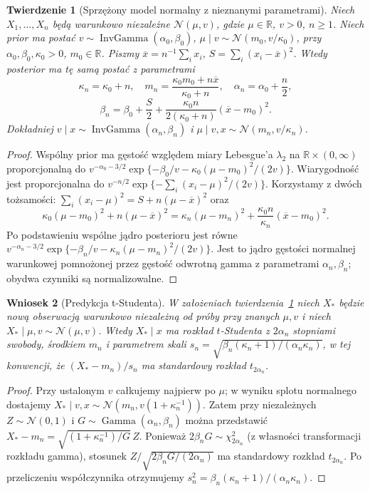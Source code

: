\documentclass[11pt,a4paper,oneside]{report}
\numberwithin{equation}{chapter}
\theoremstyle{plain}
\newtheorem{twierdzenie}{Twierdzenie}[chapter]
\newtheorem{wniosek}[twierdzenie]{Wniosek}
\theoremstyle{definition}
\theoremstyle{remark}
\newcommand{\R}{\mathbb R}
\begin{document}
\begin{twierdzenie}[Sprzężony model normalny z nieznanymi parametrami]
\label{thm:normal-invgamma}
Niech $X_1,\ldots,X_n$ będą warunkowo niezależne
$\mathcal N(\mu,v)$, gdzie $\mu\in\R$, $v>0$, $n\ge1$.
Niech prior ma postać
$v\sim\operatorname{InvGamma}(\alpha_0,\beta_0)$,
$\mu\mid v\sim\mathcal N(m_0,v/\kappa_0)$,
przy $\alpha_0,\beta_0,\kappa_0>0$, $m_0\in\R$.
Piszmy $\overline x=n^{-1}\sum_ix_i$,
$S=\sum_i(x_i-\overline x)^2$. Wtedy posterior ma tę samą
postać z parametrami
\[
 \kappa_n=\kappa_0+n,\quad
 m_n=\frac{\kappa_0m_0+n\overline x}{\kappa_0+n},\quad
 \alpha_n=\alpha_0+\frac n2,
\]
\[
 \beta_n=\beta_0+\frac S2+
 \frac{\kappa_0n}{2(\kappa_0+n)}(\overline x-m_0)^2.
\]
Dokładniej $v\mid x\sim\operatorname{InvGamma}(\alpha_n,\beta_n)$
i $\mu\mid v,x\sim\mathcal N(m_n,v/\kappa_n)$.
\end{twierdzenie}
\begin{proof}
Wspólny prior ma gęstość względem miary Lebesgue'a $\lambda_2$
na $\R\times(0,\infty)$
proporcjonalną do
$v^{-\alpha_0-3/2}\exp\{-\beta_0/v-
\kappa_0(\mu-m_0)^2/(2v)\}$.
Wiarygodność jest proporcjonalna do
$v^{-n/2}\exp\{-\sum_i(x_i-\mu)^2/(2v)\}$.
Korzystamy z dwóch tożsamości:
$\sum_i(x_i-\mu)^2=S+n(\mu-\overline x)^2$ oraz
\[
 \kappa_0(\mu-m_0)^2+n(\mu-\overline x)^2
 =\kappa_n(\mu-m_n)^2+
 \frac{\kappa_0n}{\kappa_n}(\overline x-m_0)^2.
\]
Po podstawieniu wspólne jądro posterioru jest równe
$v^{-\alpha_n-3/2}\exp\{-\beta_n/v-
\kappa_n(\mu-m_n)^2/(2v)\}$.
Jest to jądro gęstości normalnej warunkowej pomnożonej przez
gęstość odwrotną gamma z parametrami $\alpha_n,\beta_n$;
obydwa czynniki są normalizowalne.
\end{proof}

\begin{wniosek}[Predykcja t-Studenta]
\label{cor:student-predictive}
W założeniach twierdzenia~\ref{thm:normal-invgamma}
niech $X_*$ będzie nową obserwacją warunkowo niezależną
od próby przy znanych $\mu,v$ i niech $X_*\mid\mu,v\sim
\mathcal N(\mu,v)$. Wtedy $X_*\mid x$ ma rozkład
$t$-Studenta z $2\alpha_n$ stopniami swobody, środkiem $m_n$
i parametrem skali
$s_n=\sqrt{\beta_n(\kappa_n+1)/(\alpha_n\kappa_n)}$,
w tej konwencji, że $(X_*-m_n)/s_n$ ma standardowy rozkład
$t_{2\alpha_n}$.
\end{wniosek}
\begin{proof}
Przy ustalonym $v$ całkujemy najpierw po $\mu$;
w wyniku splotu normalnego dostajemy
$X_*\mid v,x\sim\mathcal N(m_n,v(1+\kappa_n^{-1}))$.
Zatem przy niezależnych $Z\sim\mathcal N(0,1)$
i $G\sim\operatorname{Gamma}(\alpha_n,\beta_n)$
można przedstawić $X_*-m_n=\sqrt{(1+\kappa_n^{-1})/G}\,Z$.
Ponieważ $2\beta_n G\sim\chi^2_{2\alpha_n}$
(z własności transformacji rozkładu gamma), stosunek
$Z/\sqrt{2\beta_nG/(2\alpha_n)}$ ma standardowy rozkład
$t_{2\alpha_n}$. Po przeliczeniu współczynnika otrzymujemy
$s_n^2=\beta_n(\kappa_n+1)/(\alpha_n\kappa_n)$.
\end{proof}
\end{document}
